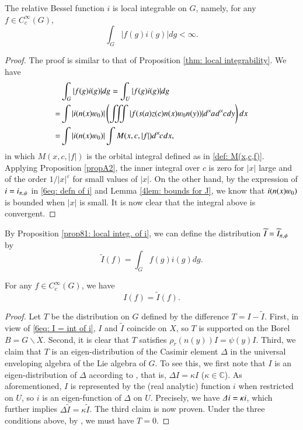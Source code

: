 \documentclass{amsproc}
\newcommand{\BC}{{\mathbb {C}}} \newcommand{\BD}{{\mathbb {D}}}
\def\shskip{\hskip 0.5 pt}
\def\dx{d^{\times} \hskip -1 pt}
\theoremstyle{plain}
\numberwithin{equation}{section}
\begin{document}
\begin{prop}\label{prop81: local integ. of i} The relative Bessel function
	$i $ is local integrable on $G$, namely, for any $f\in C_c^\infty(G)$,
	\[
	\int_G |f(g) i (g)|dg< \infty.
	\]
\end{prop}
\begin{proof} The proof is similar to that of Proposition \ref{thm: local integrability}. We have
	\begin{align*}
	& \int_G |f(g)i (g)|dg=\int_U |f(g)i (g)|dg  \\
	= & \int |i(n(x)\varw_0)|\left(\iiint|f(s(a)z(c)n(x)\varw_0n(y))|\dx  a\shskip \dx  c\shskip dy\right)dx \\
	= & \int |i(n(x)\varw_0)| \int M (x, c, |f|)  \dx  c \shskip  dx,
	\end{align*}
	in which $M (x, c, |f|) $ is the orbital integral defined as in \eqref{def: M(x,c,f)}.
	Applying Proposition \ref{propA2}, the inner integral over $c$ is zero for $|x|$   large and of the order $1/|x|^\varepsilon$ for small values of $|x|$. On the other hand, by the expression of $i=i_{\pi,\shskip \psi}$ in \eqref{6eq: defn of i} and Lemma \ref{4lem: bounds for J}, we know that $i (n(x)\varw_0)$ is bounded when $|x|$ is small. It is now clear that the integral above is convergent.
\end{proof}

By Proposition \ref{prop81: local integ. of i}, we can define the distribution $\widetilde I=\widetilde I_{\pi,\shskip \psi}$ by
\[
\widetilde I (f)=\int_G f(g) i (g) dg.
\]

\begin{prop}\label{prop82:regularity of I}
	For any $f\in C_c^\infty(G)$, we have
	\[
	I (f)=\widetilde I (f).
	\]
\end{prop}
\begin{proof}
	Let $T$ be the distribution on $G$ defined by the difference $T=I-\widetilde I$. First, in view of \eqref{6eq: I = int of i},  $I$ and $\widetilde I$ coincide on $X$, so $T$ is supported on the Borel $B = G\smallsetminus X$. Second, it is clear that $T$ satisfies  $\rho_r(n(y))I=\psi(y)I$. Third, we claim that $T$ is an eigen-distribution of  the Casimir element $\varDelta$ in the universal enveloping algebra of the Lie algebra of $G$. To see this, we first note that  $I$ is an eigen-distribution of $\varDelta$ according to \cite[\S 3]{Shalika-MO}, that is,  $\varDelta I= \kappa I$ ($\kappa \in \BC$). As aforementioned, $I$ is represented by the (real analytic) function $i$ when restricted on $ U $, so $i$ is an eigen-function of $\varDelta$  on $U$. %
	 Precisely, we have $\varDelta \shskip i = \kappa \shskip i$, which further implies $\varDelta \widetilde I= \kappa \widetilde I$. The third claim is now proven. Under the three conditions above, by    \cite[Proposition 2.10]{Shalika-MO}, we must have $T=0$.
\end{proof}
\end{document}
